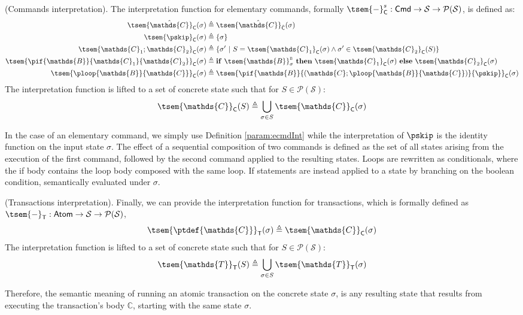 \begin{defn}
	(Commands interpretation).
	The interpretation function for elementary commands, formally $\tsem{-}^s_{\mathsf{C}} : \mathsf{Cmd} \rightarrow \mathcal{S} \rightarrow \mathcal{P}(\mathcal{S})$, is defined as:
	\begin{align*}
		\tsem{\hat{\mathds{C}}}_{\mathsf{C}}(\sigma) &\triangleq \tsem{\hat{\mathds{C}}}_{\hat{\mathsf{C}}}(\sigma)
		\\
		\tsem{\pskip}_{\mathsf{C}}(\sigma) &\triangleq \{ \sigma \}
		\\
		\tsem{\mathds{C}_1 ; \mathds{C}_2}_{\mathsf{C}}(\sigma) &\triangleq \{ \sigma'\ |\ S = \tsem{\mathds{C}_1}_\mathsf{C}(\sigma) \land \sigma' \in \tsem{\mathds{C}_2}_\mathsf{C}(S) \}
		\\
		\tsem{\pif{\mathds{B}}{\mathds{C}_1}{\mathds{C}_2}}_\mathsf{C}(\sigma) &\triangleq \mathbf{if}\ \tsem{\mathds{B}}^\textsc{b}_{\sigma}\ \mathbf{then}\ \tsem{\mathds{C}_1}_\mathsf{C}(\sigma)\ \mathbf{else}\ \tsem{\mathds{C}_2}_\mathsf{C}(\sigma)
		\\
		\tsem{\ploop{\mathds{B}}{\mathds{C}}}_\mathsf{C}(\sigma) &\triangleq \tsem{\pif{\mathds{B}}{\left(\mathds{C};\ploop{\mathds{B}}{\mathds{C}}\right)}{\pskip}}_\mathsf{C}(\sigma)
	\end{align*}
	The interpretation function is lifted to a set of concrete state such that for $S \in \mathcal{P}(\mathcal{S})$:
	\[
		\tsem{\mathds{C}}_\mathsf{C}(S) \triangleq \bigcup_{\sigma \in S} \tsem{\mathds{C}}_\mathsf{C}(\sigma)
	\]	
\end{defn}
In the case of an elementary command, we simply use Definition \ref{param:ecmdInt} while the interpretation of $\pskip$ is the identity function on the input state $\sigma$. The effect of a sequential composition of two commands is defined as the set of all states arising from the execution of the first command, followed by the second command applied to the resulting states. Loops are rewritten as conditionals, where the if body contains the loop body composed with the same loop. If statements are instead applied to a state by branching on the boolean condition, semantically evaluated under $\sigma$.

\begin{defn}
	(Transactions interpretation).
	Finally, we can provide the interpretation function for transactions, which is formally defined as $\tsem{-}_\mathsf{T} : \mathsf{Atom} \rightarrow \mathcal{S} \rightarrow \mathcal{P}(\mathcal{S})$,
	\[
		\tsem{\ptdef{\mathds{C}}}_\mathsf{T}(\sigma) \triangleq \tsem{\mathds{C}}_\mathsf{C}(\sigma)
	\]
	The interpretation function is lifted to a set of concrete state such that for $S \in \mathcal{P}(\mathcal{S})$:
	\[
		\tsem{\mathds{T}}_\mathsf{T}(S) \triangleq \bigcup_{\sigma \in S}  \tsem{\mathds{T}}_\mathsf{T}(\sigma)
	\]
\end{defn}
Therefore, the semantic meaning of running an atomic transaction on the concrete state $\sigma$, is any resulting state that results from executing the transaction's body $\mathds{C}$, starting with the same state $\sigma$.